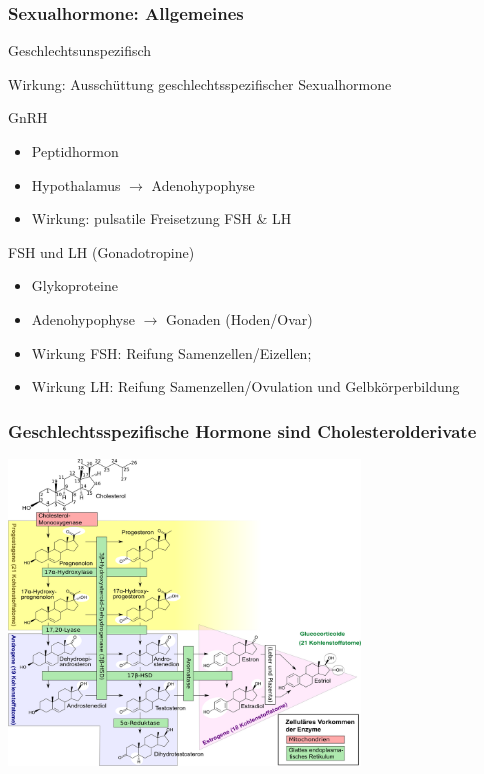 \documentclass{beamer}
\begin{document}
\begin{frame}
\frametitle{Sexualhormone: Allgemeines}


\begin{block}{Geschlechtsunspezifisch}

Wirkung: Ausschüttung geschlechtsspezifischer Sexualhormone \\[0.5 cm]
 
\pause

GnRH
\begin{itemize} 
\item Peptidhormon 
\item Hypothalamus \(\rightarrow\) Adenohypophyse
\item Wirkung: pulsatile Freisetzung FSH \& LH \\[0.5 cm]
\end{itemize}

\pause

FSH und LH (Gonadotropine) 
\begin{itemize}
\item Glykoproteine 
\item  Adenohypophyse \(\rightarrow\) Gonaden (Hoden/Ovar)
\item Wirkung FSH: Reifung Samenzellen/Eizellen; 
\item Wirkung LH: Reifung Samenzellen/Ovulation und Gelbkörperbildung
\end{itemize}
\end{block}

\end{frame}



\begin{frame}
\frametitle{Geschlechtsspezifische Hormone sind Cholesterolderivate}

\begin{center}
\includegraphics[width=0.7\textwidth]{biosynthese_sexualhormone.png}
\end{center}


\end{frame}
\end{document}

